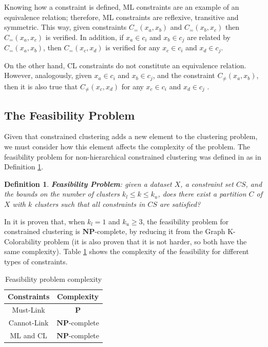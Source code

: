 \documentclass[review]{elsarticle}
\newtheorem{definition}{Definition}
\begin{document}
Knowing how a constraint is defined, ML constraints are an example of an equivalence relation; therefore, ML constraints are reflexive, transitive and symmetric. This way, given constraints $C_=(x_a,x_b)$ and $C_=(x_b,x_c)$ then $C_=(x_a,x_c)$ is verified. In addition, if $x_a \in c_i$ and $x_b \in c_j$ are related by $C_=(x_a,x_b)$, then $C_=(x_c,x_d)$ is verified for any $x_c \in c_i$ and $x_d \in c_j$. \cite{davidson2007survey}

On the other hand, CL constraints do not constitute an equivalence relation. However, analogously, given $x_a \in c_i$ and $x_b \in c_j$, and the constraint $C_{\neq}(x_a,x_b)$, then it is also true that $C_{\neq}(x_c,x_d)$ for any $x_c \in c_i$ and $x_d \in c_j$ \cite{davidson2007survey}.

\subsection{The Feasibility Problem} \label{sec:BackFeas}

Given that constrained clustering adds a new element to the clustering problem, we must consider how this element affects the complexity of the problem. The feasibility problem for non-hierarchical constrained clustering was defined in \cite{davidson2005clustering} as in Definition \ref{def1}.

\begin{definition}

	\textbf{Feasibility Problem}: given a dataset $X$, a constraint set $CS$, and the bounds on the number of clusters $k_l \leq k \leq k_u$, does there exist a partition $C$ of $X$ with $k$ clusters such that all constraints in $CS$ are satisfied? \cite{davidson2005clustering}
	\label{def1}

\end{definition}

In \cite{davidson2005clustering} it is proven that, when $k_l = 1$ and $k_u \ge 3$, the feasibility problem for constrained clustering is $\mathbf{NP}$-complete, by reducing it from the Graph K-Colorability problem (it is also proven that it is not harder, so both have the same complexity). Table \ref{tab:feasibility} shows the complexity of the feasibility for different types of constraints.

\begin{table}[!h]
	\centering
	\setlength{\tabcolsep}{7pt}
	\renewcommand{\arraystretch}{1.2}
		\begin{tabular}{c c}
			\hline
			Constraints & Complexity \\
			\hline
			Must-Link & $\mathbf{P}$\\
			Cannot-Link & $\mathbf{NP}$-complete\\
			ML and CL & $\mathbf{NP}$-complete\\
			\hline

		\end{tabular}%
	\caption{Feasibility problem complexity \cite{davidson2005clustering}}
	\label{tab:feasibility}
\end{table}
\end{document}
